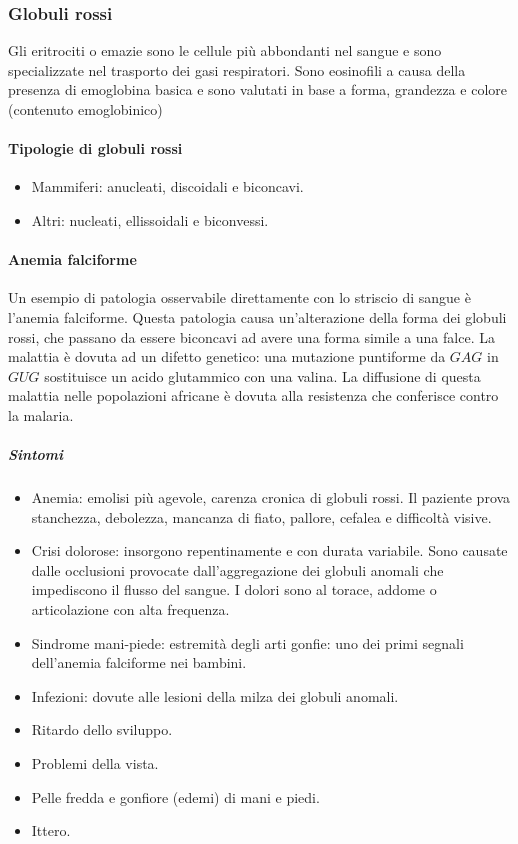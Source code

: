 		\subsubsection{Globuli rossi}
		Gli eritrociti o emazie sono le cellule pi\`u abbondanti nel sangue e sono specializzate nel trasporto dei gasi respiratori.
		Sono eosinofili a causa della presenza di emoglobina basica e sono valutati in base a forma, grandezza e colore (contenuto emoglobinico)
			
			\paragraph{Tipologie di globuli rossi}
			\begin{itemize}
				\item Mammiferi: anucleati, discoidali e biconcavi.
				\item Altri: nucleati, ellissoidali e biconvessi.
			\end{itemize}
			
			\paragraph{Anemia falciforme}
			Un esempio di patologia osservabile direttamente con lo striscio di sangue \`e l'anemia falciforme. 
			Questa patologia causa un'alterazione della forma dei globuli rossi, che passano da essere biconcavi ad avere una forma simile a una falce. 
			La malattia \`e dovuta ad un difetto genetico: una mutazione puntiforme da $GAG$ in $GUG$ sostituisce un acido glutammico con una valina. 
			La diffusione di questa malattia nelle popolazioni africane \`e dovuta alla resistenza che conferisce contro la malaria.
				
				\subparagraph{Sintomi}
				\begin{itemize}
					\item Anemia: emolisi pi\`u agevole, carenza cronica di globuli rossi. 
						Il paziente prova stanchezza, debolezza, mancanza di fiato, pallore, cefalea e difficolt\`a visive.
					\item Crisi dolorose: insorgono repentinamente e con durata variabile.
						Sono causate dalle occlusioni provocate dall'aggregazione dei globuli anomali che impediscono il flusso del sangue.
						I dolori sono al torace, addome o articolazione con alta frequenza.
					\item Sindrome mani-piede: estremit\`a degli arti gonfie: uno dei primi segnali dell'anemia falciforme nei bambini.
					\item Infezioni: dovute alle lesioni della milza dei globuli anomali.
					\item Ritardo dello sviluppo.
					\item Problemi della vista.
					\item Pelle fredda e gonfiore (edemi) di mani e piedi.
					\item Ittero.
				\end{itemize}

